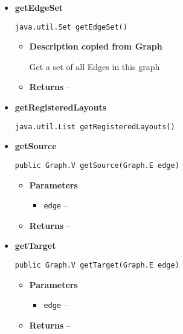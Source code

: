 {{{{{{{{{{{{{{\begin{itemize}
{\begin{itemize}
{Returns an list of edges.
}
\item{{\bf  Returns} -- 
 
}%
\end{itemize}
}%
\item{ 
{\bf  getEdgeSet}\\
\begin{lstlisting}[frame=none]
java.util.Set getEdgeSet()\end{lstlisting} %
\begin{itemize}
\item{
{\bf  Description copied from Graph{\small {}} }

Get a set of all Edges in this graph
}
\item{{\bf  Returns} -- 
 
}%
\end{itemize}
}%
\item{ 
{\bf  getRegisteredLayouts}\\
\begin{lstlisting}[frame=none]
java.util.List getRegisteredLayouts()\end{lstlisting} %
}%
\item{ 
{\bf  getSource}\\
\begin{lstlisting}[frame=none]
public Graph.V getSource(Graph.E edge)\end{lstlisting} %
\begin{itemize}
\item{
{\bf  Parameters}
  \begin{itemize}
   \item{
\texttt{edge} -- }
  \end{itemize}
}%
\item{{\bf  Returns} -- 
 
}%
\end{itemize}
}%
\item{ 
{\bf  getTarget}\\
\begin{lstlisting}[frame=none]
public Graph.V getTarget(Graph.E edge)\end{lstlisting} %
\begin{itemize}
\item{
{\bf  Parameters}
  \begin{itemize}
   \item{
\texttt{edge} -- }
  \end{itemize}
}%
\item{{\bf  Returns} -- 
 
}
\end{itemize}}
\end{itemize}}}}}}}}}}}}}}}
